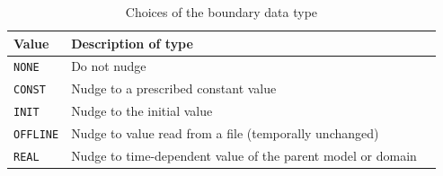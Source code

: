 \begin{table}[h]
\begin{center}
\caption{Choices of the boundary data type}
\label{tab:nml_atmos_boundary_type}
\begin{tabularx}{150mm}{lXX} \hline
  \rowcolor[gray]{0.9} Value & Description of type \\ \hline
  \verb|NONE|    & Do not nudge \\
  \verb|CONST|   & Nudge to a prescribed constant value \\
  \verb|INIT|    & Nudge to the initial value \\
  \verb|OFFLINE| & Nudge to value read from a file (temporally unchanged) \\
  \verb|REAL|    & Nudge to time-dependent value of the parent model or domain \\
  \hline
\end{tabularx}
\end{center}
\end{table}


